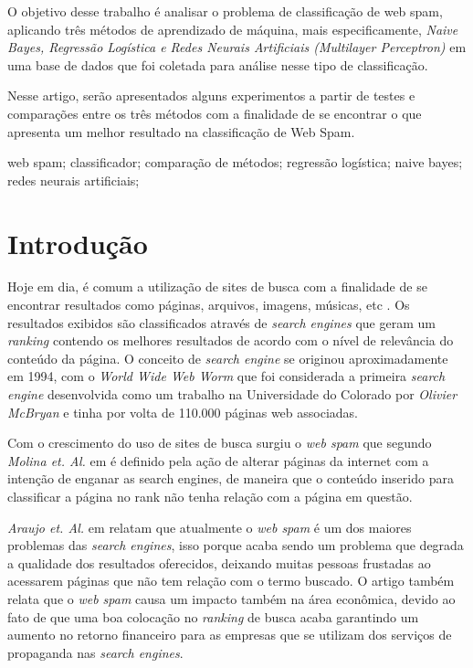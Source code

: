 \documentclass[10pt, conference, compsocconf]{IEEEtran}
\begin{document}
O objetivo desse trabalho é analisar o problema de classificação de web spam, aplicando três métodos de aprendizado de máquina, mais especificamente, \textit{Naive Bayes, Regressão Logística e Redes Neurais Artificiais (Multilayer Perceptron)} em uma base de dados que foi coletada para análise nesse tipo de classificação.
 
Nesse artigo, serão apresentados alguns experimentos a partir de testes e comparações entre os três métodos com a finalidade de se encontrar o que apresenta um melhor resultado na classificação de Web Spam.

\begin{IEEEkeywords}
web spam; classificador; comparação de métodos; regressão logística; naive bayes; redes neurais artificiais;
\end{IEEEkeywords}

\section{Introdução} 
Hoje em dia, é comum a utilização de sites de busca com a finalidade de se encontrar resultados como páginas, arquivos, imagens, músicas, etc . Os resultados exibidos são classificados através de \textit{search engines} que geram um \textit{ranking} contendo os melhores resultados de acordo com o nível de relevância do conteúdo da página. O conceito de \textit{search engine} se originou aproximadamente em 1994, com o \textit{World Wide Web Worm} que foi considerada a primeira \textit{search engine} desenvolvida como um trabalho na Universidade do Colorado por \textit{Olivier McBryan} e tinha por volta de 110.000 páginas web associadas. \cite{1}

Com o crescimento do uso de sites de busca surgiu o \textit{web spam} que segundo \textit{Molina et. Al.} em \cite{2} é definido pela ação de alterar páginas da internet com a intenção de enganar as search engines, de maneira que o conteúdo inserido para classificar a página no rank não tenha relação com a página em questão.

\textit{Araujo et. Al.} em \cite{3} relatam que atualmente o \textit{web spam} é um dos maiores problemas das \textit{search engines}, isso porque acaba sendo um problema que degrada a qualidade dos resultados oferecidos, deixando muitas pessoas frustadas ao acessarem páginas que não tem relação com o termo buscado. O artigo também relata que o \textit{web spam} causa um impacto também na área econômica, devido ao fato de que uma boa colocação no \textit{ranking} de busca acaba garantindo um aumento no retorno financeiro para as empresas que se utilizam dos serviços de propaganda nas \textit{search engines}.
\end{document}
